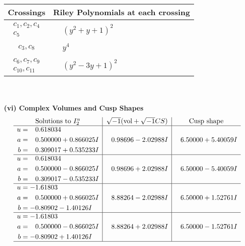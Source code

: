 \documentclass[1p]{elsarticle_modified}
\theoremstyle{definition}
\newcommand{\I}{\sqrt{-1}}
\begin{document}
\begin{tabular}{m{50pt}|m{274pt}}
Crossings & \hspace{64pt}Riley Polynomials at each crossing \\
\hline $$\begin{aligned}c_{1},c_{2},c_{4}\\c_{5}\end{aligned}$$&$\begin{aligned}
&(y^2+y+1)^2
\end{aligned}$\\
\hline $$\begin{aligned}c_{3},c_{8}\end{aligned}$$&$\begin{aligned}
&y^4
\end{aligned}$\\
\hline $$\begin{aligned}c_{6},c_{7},c_{9}\\c_{10},c_{11}\end{aligned}$$&$\begin{aligned}
&(y^2-3 y+1)^2
\end{aligned}$\\
\hline
\end{tabular}\\~\\
\newpage\flushleft \textbf{(vi) Complex Volumes and Cusp Shapes}
$$\begin{array}{c|c|c}  
\text{Solutions to }I^u_{2}& \I (\text{vol} + \sqrt{-1}CS) & \text{Cusp shape}\\
 \hline 
\begin{aligned}
u &= \phantom{-}0.618034\phantom{ +0.000000I} \\
a &= \phantom{-}0.500000 + 0.866025 I \\
b &= \phantom{-}0.309017 + 0.535233 I\end{aligned}
 & \phantom{-}0.98696 - 2.02988 I & \phantom{-}6.50000 + 5.40059 I \\ \hline\begin{aligned}
u &= \phantom{-}0.618034\phantom{ +0.000000I} \\
a &= \phantom{-}0.500000 - 0.866025 I \\
b &= \phantom{-}0.309017 - 0.535233 I\end{aligned}
 & \phantom{-}0.98696 + 2.02988 I & \phantom{-}6.50000 - 5.40059 I \\ \hline\begin{aligned}
u &= -1.61803\phantom{ +0.000000I} \\
a &= \phantom{-}0.500000 + 0.866025 I \\
b &= -0.80902 - 1.40126 I\end{aligned}
 & \phantom{-}8.88264 - 2.02988 I & \phantom{-}6.50000 + 1.52761 I \\ \hline\begin{aligned}
u &= -1.61803\phantom{ +0.000000I} \\
a &= \phantom{-}0.500000 - 0.866025 I \\
b &= -0.80902 + 1.40126 I\end{aligned}
 & \phantom{-}8.88264 + 2.02988 I & \phantom{-}6.50000 - 1.52761 I\\
 \hline 
 \end{array}$$\newpage
\end{document}
